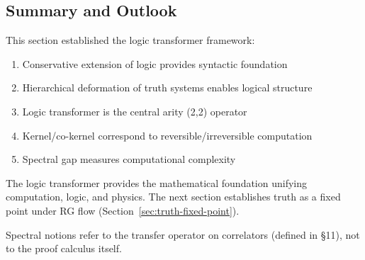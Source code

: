 \subsection{Summary and Outlook}

This section established the logic transformer framework:

\begin{enumerate}
\item Conservative extension of logic provides syntactic foundation
\item Hierarchical deformation of truth systems enables logical structure
\item Logic transformer is the central arity (2,2) operator
\item Kernel/co-kernel correspond to reversible/irreversible computation
\item Spectral gap measures computational complexity
\end{enumerate}

The logic transformer provides the mathematical foundation unifying computation, logic, and physics. The next section establishes truth as a fixed point under RG flow (Section~\ref{sec:truth-fixed-point}).

Spectral notions refer to the transfer operator on correlators (defined in §11), not to the proof calculus itself.
